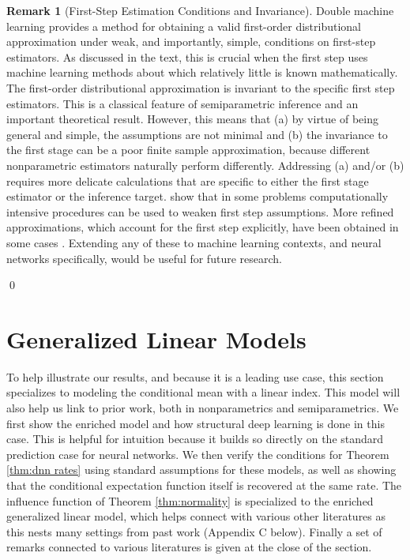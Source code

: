 \documentclass[12pt]{article}
\numberwithin{equation}{section}
\theoremstyle{definition}
\newtheorem{remarkTmp}{Remark}
\newenvironment{remark}
	{\medskip  \begin{remarkTmp} 	}
	{ 
		\renewcommand{\qedsymbol}{$\clubsuit$}
		\qed 
		\end{remarkTmp} 
	}
\begin{document}
\begin{appendices}
\begin{remark}[First-Step Estimation Conditions and Invariance]
Double machine learning provides a method for obtaining a valid first-order distributional approximation under weak, and importantly, simple, conditions on first-step estimators. As discussed in the text, this is crucial when the first step uses machine learning methods about which relatively little is known mathematically. The first-order distributional approximation is invariant to the specific first step estimators. This is a classical feature of semiparametric inference \citep{Newey1994_Ecma,Newey-McFadden1994_handbook} and an important theoretical result. However, this means that (a) by virtue of being general and simple, the assumptions are not minimal and (b) the invariance to the first stage can be a poor finite sample approximation, because different nonparametric estimators naturally perform differently. Addressing (a) and/or (b) requires more delicate calculations that are specific to either the first stage estimator or the inference target. \cite{Cattaneo-Jansson-Ma2019_RESTUD} show that in some problems computationally intensive procedures can be used to weaken first step assumptions. More refined approximations, which account for the first step explicitly, have been obtained in some cases \citep{Cattaneo-Crump-Jansson2014_ET_small,Cattaneo-Jansson-Newey2018_JASA,Cattaneo-Farrell-Jansson-Masini2025_JoE}. Extending any of these to machine learning contexts, and neural networks specifically, would be useful for future research.
\end{remark}






\section{Generalized Linear Models}
    \label{appx:glm}


To help illustrate our results, and because it is a leading use case, this section specializes to modeling the conditional mean with a linear index. This model will also help us link to prior work, both in nonparametrics and semiparametrics. We first show the enriched model and how structural deep learning is done in this case. This is helpful for intuition because it builds so directly on the standard prediction case for neural networks. We then verify the conditions for Theorem \ref{thm:dnn rates} using standard assumptions for these models, as well as showing that the conditional expectation function itself is recovered at the same rate. The influence function of Theorem \ref{thm:normality} is specialized to the enriched generalized linear model, which helps connect with various other literatures as this nests many settings from past work (Appendix C below). Finally a set of remarks connected to various literatures is given at the close of the section.


\end{appendices}
\end{document}
